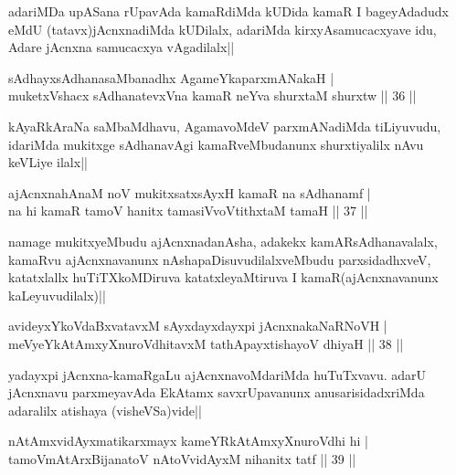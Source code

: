 \begin{artha}
adariMDa upASana rUpavAda kamaRdiMda kUDida kamaR I bageyAdadudx eMdU (tatavx)jAcnxnadiMda kUDilalx, adariMda kirxyAsamucacxyave idu, Adare jAcnxna samucacxya vAgadilalx||
\end{artha}


\begin{shl}
sAdhayxsAdhanasaMbanadhx AgameYkaparxmANakaH |\\
muketxVshacx sAdhanatevxVna kamaR neYva shurxtaM shurxtw \hfill || 36 ||
\end{shl}

\begin{artha}
kAyaRkAraNa saMbaMdhavu, AgamavoMdeV parxmANadiMda tiLiyuvudu, idariMda mukitxge sAdhanavAgi kamaRveMbudanunx shurxtiyalilx nAvu keVLiye ilalx||
\end{artha}


\begin{shl}
ajAcnxnahAnaM noV mukitxsatxsAyxH kamaR na sAdhanamf |\\
na hi kamaR tamoV hanitx tamasiVvoVtithxtaM tamaH \hfill || 37 ||
\end{shl}

\begin{artha}
namage mukitxyeMbudu ajAcnxnadanAsha, adakekx kamARsAdhanavalalx, kamaRvu ajAcnxnavanunx nAshapaDisuvudilalxveMbudu parxsidadhxveV, katatxlallx huTiTXkoMDiruva katatxleyaMtiruva I kamaR(ajAcnxnavanunx kaLeyuvudilalx)||
\end{artha}


\begin{shl}
avideyxYkoVdaBxvatavxM sAyxdayxdayxpi jAcnxnakaNaRNoVH |\\
meVyeYkAtAmxyXnuroVdhitavxM tathA\s payxtishayoV dhiyaH \hfill || 38 ||
\end{shl}

\begin{artha}
yadayxpi jAcnxna-kamaRgaLu ajAcnxnavoMdariMda huTuTxvavu. adarU jAcnxnavu parxmeyavAda EkAtamx savxrUpavanunx anusarisidadxriMda adaralilx atishaya (visheVSa)vide||
\end{artha}

\begin{shl}
nA\s \s tAmxvidAyxmatikarxmayx kameYRkAtAmxyXnuroVdhi hi |\\
tamoVmAtArxBijanatoV nAtoV\s vidAyxM nihanitx tatf \hfill || 39 ||
\end{shl}

